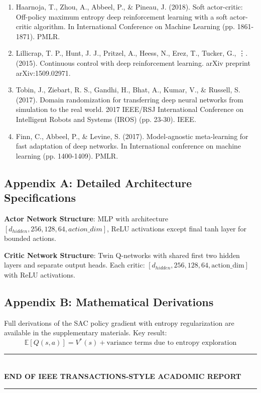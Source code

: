 \documentclass[10pt,a4paper,twocolumn]{article}
\begin{document}
\begin{enumerate}
    \item Haarnoja, T., Zhou, A., Abbeel, P., \& Pineau, J. (2018). Soft actor-critic: Off-policy maximum entropy deep reinforcement learning with a soft actor-critic algorithm. In International Conference on Machine Learning (pp. 1861-1871). PMLR.
    
    \item Lillicrap, T. P., Hunt, J. J., Pritzel, A., Heess, N., Erez, T., Tucker, G., \vdots. (2015). Continuous control with deep reinforcement learning. arXiv preprint arXiv:1509.02971.
    
    \item Tobin, J., Ziebart, R. S., Gandhi, H., Bhat, A., Kumar, V., \& Russell, S. (2017). Domain randomization for transferring deep neural networks from simulation to the real world. 2017 IEEE/RSJ International Conference on Intelligent Robots and Systems (IROS) (pp. 23-30). IEEE.
    
    \item Finn, C., Abbeel, P., \& Levine, S. (2017). Model-agnostic meta-learning for fast adaptation of deep networks. In International conference on machine learning (pp. 1400-1409). PMLR.
\end{enumerate}

\vfill

\subsection*{Appendix A: Detailed Architecture Specifications}

\textbf{Actor Network Structure}: MLP with architecture $[d_{hidden}, 256, 128, 64, action\_dim]$, ReLU activations except final tanh layer for bounded actions.

\textbf{Critic Network Structure}: Twin Q-networks with shared first two hidden layers and separate output heads. Each critic: $[d_{hidden}, 256, 128, 64, \text{action\_dim}]$ with ReLU activations.

\vfill

\subsection*{Appendix B: Mathematical Derivations}

Full derivations of the SAC policy gradient with entropy regularization are available in the supplementary materials. Key result:
\begin{equation}
    \mathbb{E}[Q(s,a)] = V^*(s) + \text{variance terms due to entropy exploration}
\end{equation}

\vfill

\begin{center}
    \rule{0.9\linewidth}{0.5pt}\\[0.2cm]
    \textbf{END OF IEEE TRANSACTIONS-STYLE ACADOMIC REPORT}\\[0.2cm]
    \rule{0.9\linewidth}{0.5pt}
\end{center}
\end{document}
